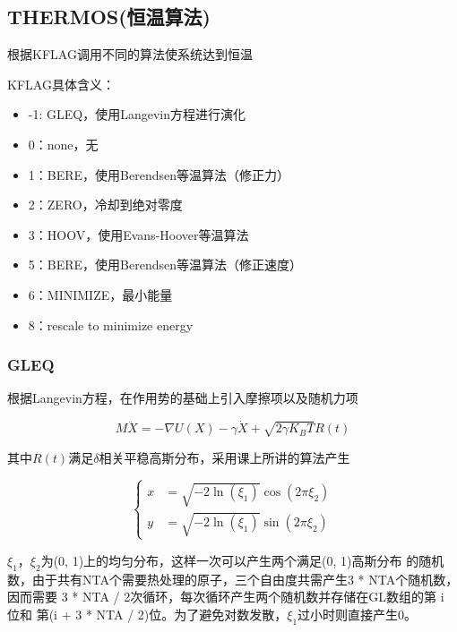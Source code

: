 \documentclass{ctexart}
\begin{document}
\subsection{THERMOS(恒温算法)}
根据KFLAG调用不同的算法使系统达到恒温

\noindent
KFLAG具体含义：

\begin{itemize}
    \item -1: GLEQ，使用Langevin方程进行演化
    \item  0：none，无
    \item  1：BERE，使用Berendsen等温算法（修正力）
    \item  2：ZERO，冷却到绝对零度
    \item  3：HOOV，使用Evans-Hoover等温算法
    \item  5：BERE，使用Berendsen等温算法（修正速度）
    \item  6：MINIMIZE，最小能量
    \item  8：rescale to minimize energy
\end{itemize}

\subsubsection{GLEQ}

根据Langevin方程，在作用势的基础上引入摩擦项以及随机力项

\begin{equation}
    M\ddot{X} = -\nabla U(X) - \gamma \dot{X} + \sqrt{2\gamma K_BT}R(t)
\end{equation}

其中$R(t)$满足$\delta$相关平稳高斯分布，采用课上所讲的算法产生

\begin{equation}
    \left\{
    \begin{aligned}
        x & = \sqrt{-2\ln(\xi_1)}\cos(2\pi\xi_2) \\
        y & = \sqrt{-2\ln(\xi_1)}\sin(2\pi\xi_2)
    \end{aligned}
    \right.
\end{equation}

$\xi_1$，$\xi_2$为(0, 1)上的均匀分布，这样一次可以产生两个满足(0, 1)高斯分布
的随机数，由于共有NTA个需要热处理的原子，三个自由度共需产生3 * NTA个随机数，
因而需要 3 * NTA / 2次循环，每次循环产生两个随机数并存储在GL数组的第 i 位和
第(i + 3 * NTA / 2)位。为了避免对数发散，$\xi_1$过小时则直接产生0。
\end{document}
